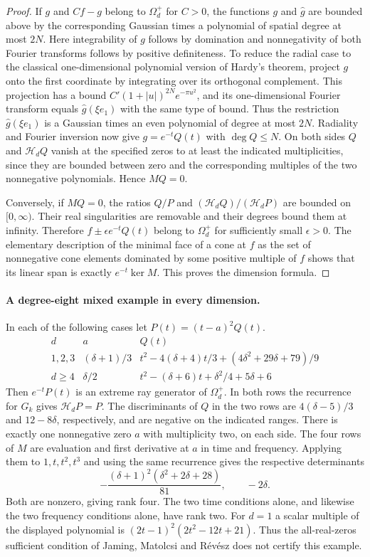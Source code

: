 \documentclass[11pt,a4paper]{article}
\numberwithin{equation}{section}
\begin{document}
\begin{proof}
If $g$ and $Cf-g$ belong to $\Omega_d^+$ for $C>0$, the functions
$g$ and $\widehat g$ are bounded above by the corresponding Gaussian
times a polynomial of spatial degree at most $2N$. Here integrability
of $g$ follows by domination and nonnegativity of both Fourier transforms
follows by positive definiteness. To reduce the radial case to the
classical one-dimensional polynomial version of Hardy's theorem, project
$g$ onto the first coordinate by integrating over its orthogonal
complement. This projection has a bound
$C'(1+|u|)^{2N}e^{-\pi u^2}$, and its one-dimensional Fourier transform
equals $\widehat g(\xi e_1)$ with the same type of bound. Thus the
restriction $\widehat g(\xi e_1)$ is a Gaussian times an even polynomial
of degree at most $2N$. Radiality and Fourier inversion now give
$g=e^{-t}Q(t)$ with $\deg Q\le N$. On both sides $Q$ and
$\mathcal H_dQ$ vanish at the specified zeros to at least the indicated
multiplicities, since they are bounded between zero and the corresponding
multiples of the two nonnegative polynomials. Hence $MQ=0$.

Conversely, if $MQ=0$, the ratios $Q/P$ and
$(\mathcal H_dQ)/(\mathcal H_dP)$ are bounded on $[0,\infty)$.
Their real singularities are removable and their degrees bound them
at infinity. Therefore $f\pm\epsilon e^{-t}Q(t)$ belong to $\Omega_d^+$
for sufficiently small $\epsilon>0$. The elementary description of the
minimal face of a cone at $f$ as the set of nonnegative cone elements
dominated by some positive multiple of $f$ shows that its linear span
is exactly $e^{-t}\ker M$. This proves the dimension formula.
\end{proof}

\paragraph{A degree-eight mixed example in every dimension.}
In each of the following cases let $P(t)=(t-a)^2Q(t)$.
\[
\begin{array}{c|c|l}
d&a&Q(t)\\ \hline
1,2,3 &(\delta+1)/3&
 t^2-4(\delta+4)t/3+(4\delta^2+29\delta+79)/9\\
d\ge4 &\delta/2&
 t^2-(\delta+6)t+\delta^2/4+5\delta+6
\end{array}
\]
Then $e^{-t}P(t)$ is an extreme ray generator of $\Omega_d^+$.
In both rows the recurrence for $G_k$ gives $\mathcal H_dP=P$.
The discriminants of $Q$ in the two rows are $4(\delta-5)/3$ and
$12-8\delta$, respectively, and are negative on the indicated ranges.
There is exactly one nonnegative zero $a$ with multiplicity two, on
each side. The four rows of $M$ are evaluation and first derivative
at $a$ in time and frequency. Applying them to $1,t,t^2,t^3$ and
using the same recurrence gives the respective determinants
\[
 -\frac{(\delta+1)^2(\delta^2+2\delta+28)}{81},
 \qquad -2\delta .
\]
Both are nonzero, giving rank four. The two time conditions alone, and
likewise the two frequency conditions alone, have rank two. For $d=1$ a
scalar multiple of the displayed polynomial is
$(2t-1)^2(2t^2-12t+21)$. Thus the all-real-zeros sufficient condition
of Jaming, Matolcsi and R\'ev\'esz does not certify this example.
\end{document}
